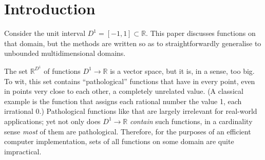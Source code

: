 \documentclass[sigplan,screen]{acmart}
\theoremstyle{acmplain}
\theoremstyle{acmdefinition}
\begin{document}


\maketitle


\section{Introduction}

Consider the unit interval $D^1 = [-1,1] \subset \mathbb{R}$.
This paper discusses functions on that domain, but the methods are written so as to straightforwardly generalise to unbounded multidimensional domains.

The set $\mathbb{R}^{D^1}$ of functions $D^1 \to \mathbb{R}$ is a vector space, but it is, in a sense, too big. To wit, this set contains “pathological” functions that have in every point, even in points very close to each other, a completely unrelated value. (A classical example is the function that assigns each rational number the value 1, each irrational 0.) Pathological functions like that are largely irrelevant for real-world applications; yet not only does $D^1 \to \mathbb{R}$ \emph{contain} such functions, in a cardinality sense \emph{most} of them are pathological. Therefore, for the purposes of an efficient computer implementation, sets of all functions on some domain are quite impractical.
\end{document}
